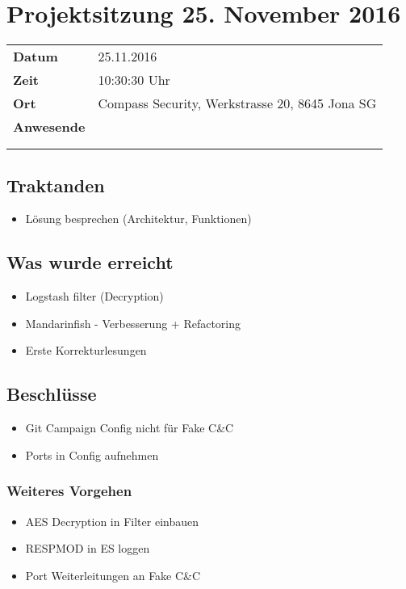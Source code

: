 \documentclass[class=scrbook,crop=false]{standalone}
\begin{document}
	\section{Projektsitzung 25. November 2016}

	\begin{tabular}{ll}
		\textbf{Datum} & 25.11.2016 \\
		\textbf{Zeit} & 10:30\textendash11:30 Uhr \\
		\textbf{Ort} & Compass Security, Werkstrasse 20, 8645 Jona SG \\
		\textbf{Anwesende} & \ibuf \\ & \fbif \\ & \sadf
	\end{tabular}

	\subsection*{Traktanden}
	\begin{itemize}
		\item Lösung besprechen (Architektur, Funktionen)
	\end{itemize}

	\subsection*{Was wurde erreicht}
	\begin{itemize}
		\item Logstash filter (Decryption)
		\item Mandarinfish - Verbesserung + Refactoring
		\item Erste Korrekturlesungen
	\end{itemize}

	\subsection*{Beschlüsse}
	\begin{itemize}
		\item Git Campaign Config nicht für Fake C\&C
		\item Ports in Config aufnehmen
	\end{itemize}

	\subsubsection*{Weiteres Vorgehen}
	\begin{itemize}
  		\item AES Decryption in Filter einbauen
  		\item RESPMOD in ES loggen
  		\item Port Weiterleitungen an Fake C\&C
	\end{itemize}
\end{document}
